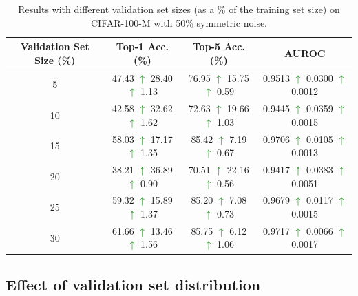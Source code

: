\documentclass{article}
\theoremstyle{plain}
\theoremstyle{definition}
\theoremstyle{remark}
\begin{document}
\begin{table}[h!] \centering  \begin{tabular}{cccc} \hline \textbf{Validation Set Size (\%)} & \textbf{Top-1 Acc. (\%)} & \textbf{Top-5 Acc. (\%)} & \textbf{AUROC} \\ \hline 5 & 47.43 \textcolor{Green}{$\uparrow$} 28.40 \textcolor{Green}{$\uparrow$} 1.13 & 76.95 \textcolor{Green}{$\uparrow$} 15.75 \textcolor{Green}{$\uparrow$} 0.59 & 0.9513 \textcolor{Green}{$\uparrow$} 0.0300 \textcolor{Green}{$\uparrow$} 0.0012 \\ 10 & 42.58 \textcolor{Green}{$\uparrow$} 32.62 \textcolor{Green}{$\uparrow$} 1.62 & 72.63 \textcolor{Green}{$\uparrow$} 19.66 \textcolor{Green}{$\uparrow$} 1.03 & 0.9445 \textcolor{Green}{$\uparrow$} 0.0359 \textcolor{Green}{$\uparrow$} 0.0015 \\ 15 & 58.03 \textcolor{Green}{$\uparrow$} 17.17 \textcolor{Green}{$\uparrow$} 1.35 & \hspace{0.5em}85.42 \textcolor{Green}{$\uparrow$} \hspace{0.5em}7.19 \textcolor{Green}{$\uparrow$} 0.67\hspace{0.5em} & 0.9706 \textcolor{Green}{$\uparrow$} 0.0105 \textcolor{Green}{$\uparrow$} 0.0013 \\ 20 & 38.21 \textcolor{Green}{$\uparrow$} 36.89 \textcolor{Green}{$\uparrow$} 0.90 & 70.51 \textcolor{Green}{$\uparrow$} 22.16 \textcolor{Green}{$\uparrow$} 0.56 & 0.9417 \textcolor{Green}{$\uparrow$} 0.0383 \textcolor{Green}{$\uparrow$} 0.0051 \\ 25 & 59.32 \textcolor{Green}{$\uparrow$} 15.89 \textcolor{Green}{$\uparrow$} 1.37 & 85.20 \textcolor{Green}{$\uparrow$} \hspace{0.5em}7.08 \textcolor{Green}{$\uparrow$} 0.73 & 0.9679 \textcolor{Green}{$\uparrow$} 0.0117 \textcolor{Green}{$\uparrow$} 0.0015 \\ 30 & 61.66 \textcolor{Green}{$\uparrow$} 13.46 \textcolor{Green}{$\uparrow$} 1.56 & 85.75 \textcolor{Green}{$\uparrow$} \hspace{0.5em}6.12 \textcolor{Green}{$\uparrow$} 1.06 & 0.9717 \textcolor{Green}{$\uparrow$} 0.0066 \textcolor{Green}{$\uparrow$} 0.0017 \\ \hline \end{tabular} \caption{Results with different validation set sizes (as a \% of the training set size) on CIFAR-100-M with 50\% symmetric noise. \label{table:valsize}} \end{table}

\subsection{Effect of validation set distribution}
\label{supp:valdist}
\end{document}
